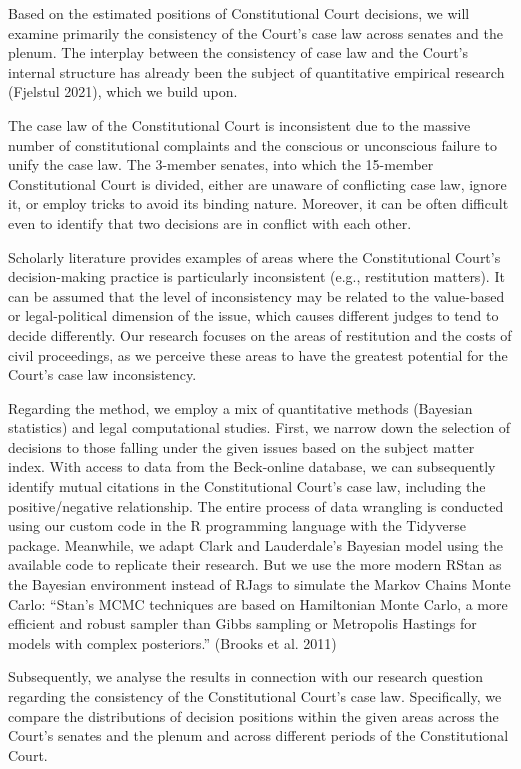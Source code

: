 \documentclass[
  11pt,
]{article}
\begin{document}
Based on the estimated positions of Constitutional Court decisions, we
will examine primarily the consistency of the Court's case law across
senates and the plenum. The interplay between the consistency of case
law and the Court's internal structure has already been the subject of
quantitative empirical research (Fjelstul 2021), which we build upon.

The case law of the Constitutional Court is inconsistent due to the
massive number of constitutional complaints and the conscious or
unconscious failure to unify the case law. The 3-member senates, into
which the 15-member Constitutional Court is divided, either are unaware
of conflicting case law, ignore it, or employ tricks to avoid its
binding nature. Moreover, it can be often difficult even to identify
that two decisions are in conflict with each other.

Scholarly literature provides examples of areas where the Constitutional
Court's decision-making practice is particularly inconsistent (e.g.,
restitution matters). It can be assumed that the level of inconsistency
may be related to the value-based or legal-political dimension of the
issue, which causes different judges to tend to decide differently. Our
research focuses on the areas of restitution and the costs of civil
proceedings, as we perceive these areas to have the greatest potential
for the Court's case law inconsistency.

Regarding the method, we employ a mix of quantitative methods (Bayesian
statistics) and legal computational studies. First, we narrow down the
selection of decisions to those falling under the given issues based on
the subject matter index. With access to data from the Beck-online
database, we can subsequently identify mutual citations in the
Constitutional Court's case law, including the positive/negative
relationship. The entire process of data wrangling is conducted using
our custom code in the R programming language with the Tidyverse
package. Meanwhile, we adapt Clark and Lauderdale's Bayesian model using
the available code to replicate their research. But we use the more
modern RStan as the Bayesian environment instead of RJags to simulate
the Markov Chains Monte Carlo: ``Stan's MCMC techniques are based on
Hamiltonian Monte Carlo, a more efficient and robust sampler than Gibbs
sampling or Metropolis Hastings for models with complex posteriors.''
(Brooks et al. 2011)

Subsequently, we analyse the results in connection with our research
question regarding the consistency of the Constitutional Court's case
law. Specifically, we compare the distributions of decision positions
within the given areas across the Court's senates and the plenum and
across different periods of the Constitutional Court.
\end{document}
